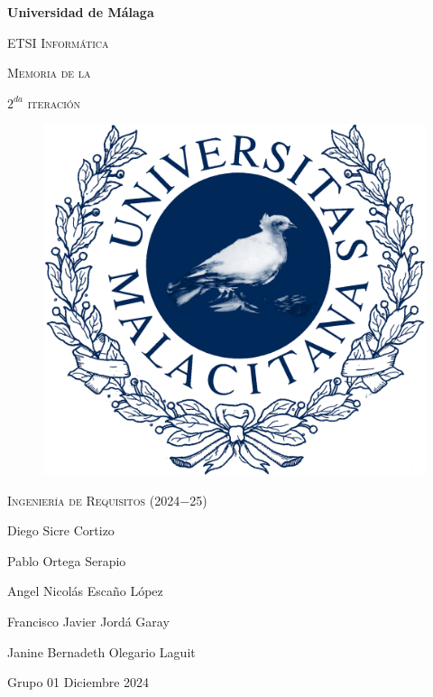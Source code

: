 \documentclass[12pt, a4paper, titlepage]{article}
\begin{document}
\begin{titlepage}
  \centering
  {\bfseries\LARGE Universidad de Málaga\par}
  \vspace{1cm}
  {\scshape\Large ETSI Informática\par}
  \vspace{2cm}
  {\scshape\Huge Memoria de la\par}
  \vspace{0.1cm}
  {\scshape\Huge $2^{da}$ iteración}
  \vspace{2cm}
  \begin{figure}[H]
      \centering
       \includegraphics[width=0.30\linewidth]{assets/umaLogo.png}
  \end{figure}
  \vfill
  {\scshape\Large Ingeniería de Requisitos (2024$-$25)\par}
  \vfill
  {\Large Diego Sicre Cortizo\par}
  {\Large Pablo Ortega Serapio\par}
  {\Large Angel Nicolás Escaño López\par}
  {\Large Francisco Javier Jordá Garay\par}
  {\Large Janine Bernadeth Olegario Laguit\par}
  \vspace{1cm}
  {\Large Grupo 01}
  \vfill
  {\Large Diciembre 2024}
\end{titlepage}
\thispagestyle{empty}

\tableofcontents %
\thispagestyle{empty} %

\newpage

\listoffigures %
\thispagestyle{empty}

\newpage


\thispagestyle{empty}
\begin{abstract}
  Para comprender mejor el rol de los actores en cada caso de uso se recomienda consultar el apartado \emph{3.3 Perfiles de los Participantes} y \emph{3.4 Perfiles de Usuario} del DGR Mini PIM donde se define cada uno y como se refiere a ellos para evitar ambigüedades. 
  También consultar \emph{1.3 Definiciones, acrónimos y abreviaturas} en caso de no entender alguna palabra técnica usada en esta memoria.
\end{abstract}
\end{document}
